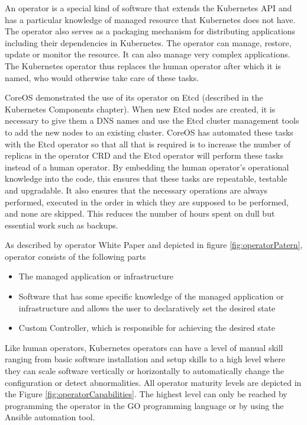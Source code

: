 An operator is a special kind of software that extends the Kubernetes API and has a particular knowledge of managed resource that Kubernetes does not have. The operator also serves as a packaging mechanism for distributing applications including their dependencies in Kubernetes. The operator can manage, restore, update or monitor the resource. It can also manage very complex applications. The Kubernetes operator thus replaces the human operator after which it is named, who would otherwise take care of these tasks. \cite{operatorsPreface} \cite{IArchiveCOSoperators}


CoreOS demonstrated the use of its operator on Etcd (described in the Kubernetes Components chapter). When new Etcd nodes are created, it is necessary to give them a DNS names and use the Etcd cluster management tools to add the new nodes to an existing cluster. CoreOS has automated these tasks with the Etcd operator so that all that is required is to increase the number of replicas in the operator CRD and the Etcd operator will perform these tasks instead of a human operator. \cite{IArchiveCOSoperators}
By embedding the human operator's operational knowledge into the code, this ensures that these tasks are repeatable, testable and upgradable. It also ensures that the necessary operations are always performed, executed in the order in which they are supposed to be performed, and none are skipped. This reduces the number of hours spent on dull but essential work such as backups. \cite{operatorWhitepaper}

As described by operator White Paper \cite{operatorWhitepaper} and depicted in figure \ref{fig:operatorPatern}, operator consists of the following parts
\begin{itemize}
    \item The managed application or infrastructure
    \item Software that has some specific knowledge of the managed application or infrastructure and allows the user to declaratively set the desired state
    \item Custom Controller, which is responsible for achieving the desired state
\end{itemize}


Like human operators, Kubernetes operators can have a level of manual skill ranging from basic software installation and setup skills to a high level where they can scale software vertically or horizontally to automatically change the configuration or detect abnormalities. All operator maturity levels are depicted in the Figure \ref{fig:operatorCapabilities}. The highest level can only be reached by programming the operator in the GO programming language or by using the Ansible automation tool. \cite{operatorsOframework}

